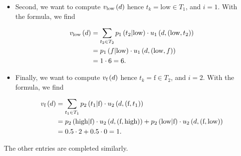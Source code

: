 \begin{enumerate}[label=\alph*.]
\begin{itemize}
     \item Second, we want to compute $v_{\text{low}} \left(d\right)$ hence $t_{k} = \text{low} \in T_1$, and $i = 1$. With the formula, we find

     \begin{align*}
         v_{\text{low}} \left(d\right)
        & = \sum_{t_{2} \in T_{2}} p_{1} \left(t_{2}|\text{low}\right) \cdot u_{1} \left(d, (\text{low}, t_{2})\right) \\
        & = p_{1} \left(f|\text{low}\right) \cdot u_{1} \left(d, (\text{low}, f)\right) \\
        & = 1 \cdot 6 = 6.
     \end{align*}

     \item Finally, we want to compute $v_{\text{f}} \left(d\right)$ hence $t_{k} = \text{f} \in T_2$, and $i = 2$. With the formula, we find

     \begin{align*}
         v_{\text{f}} \left(d\right)
        & = \sum_{t_{1} \in T_{1}} p_2 \left(t_{1}|\text{f}\right) \cdot u_{2} \left(d, (\text{f}, t_{1})\right) \\
        & = p_2 \left(\text{high}|\text{f}\right) \cdot u_{2} \left(d, (\text{f}, \text{high})\right)
        + p_2 \left(\text{low}|\text{f}\right) \cdot u_{2} \left(d, (\text{f}, \text{low})\right) \\
        & = 0.5 \cdot 2 + 0.5 \cdot 0 = 1.
     \end{align*}
\end{itemize}

The other entries are completed similarly.


\end{enumerate}

